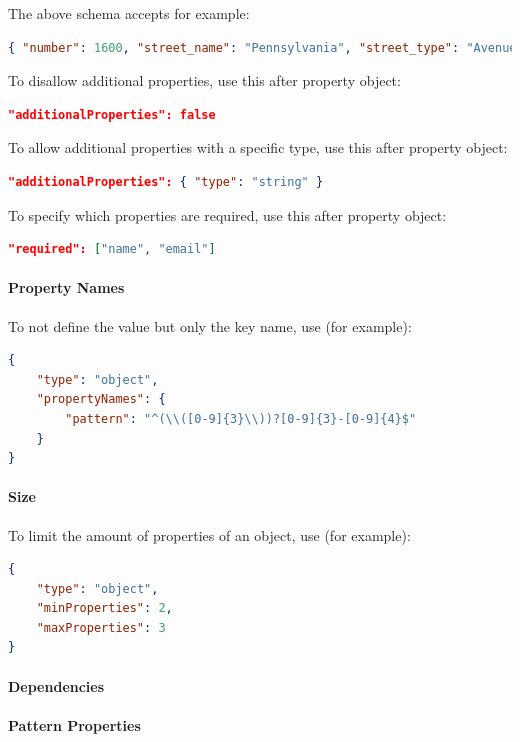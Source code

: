 The above schema accepts for example:
\begin{lstlisting}[language=json,firstnumber=1]
{ "number": 1600, "street_name": "Pennsylvania", "street_type": "Avenue" }
\end{lstlisting}

To disallow additional properties, use this after property object:
\begin{lstlisting}[language=json,firstnumber=1]
"additionalProperties": false
\end{lstlisting}

To allow additional properties with a specific type, use this after property object:
\begin{lstlisting}[language=json,firstnumber=1]
"additionalProperties": { "type": "string" }
\end{lstlisting}

To specify which properties are required, use this after property object:
\begin{lstlisting}[language=json,firstnumber=1]
"required": ["name", "email"]
\end{lstlisting}

\paragraph{Property Names}
To not define the value but only the key name, use (for example):
\begin{lstlisting}[language=json,firstnumber=1]
{ 
    "type": "object",
    "propertyNames": {
        "pattern": "^(\\([0-9]{3}\\))?[0-9]{3}-[0-9]{4}$"
    }
}
\end{lstlisting}

\paragraph{Size}
To limit the amount of properties of an object, use (for example):
\begin{lstlisting}[language=json,firstnumber=1]
{ 
    "type": "object",
    "minProperties": 2,
    "maxProperties": 3
}
\end{lstlisting}

\paragraph{Dependencies}

\paragraph{Pattern Properties}

